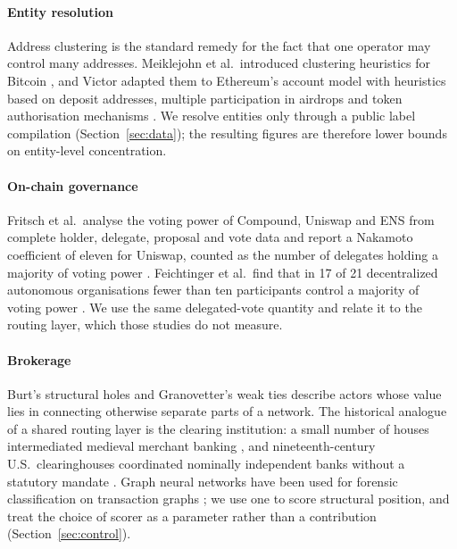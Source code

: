 \paragraph{Entity resolution}
Address clustering is the standard remedy for the fact that one operator
may control many addresses. Meiklejohn et al.\ introduced clustering
heuristics for Bitcoin \cite{meiklejohn2013fistful}, and Victor adapted
them to Ethereum's account model with heuristics based on deposit
addresses, multiple participation in airdrops and token authorisation
mechanisms \cite{victor2020clustering}. We resolve entities only through a public label
compilation (Section~\ref{sec:data}); the resulting figures are therefore
lower bounds on entity-level concentration.

\paragraph{On-chain governance}
Fritsch et al.\ analyse the voting power of Compound, Uniswap and ENS from
complete holder, delegate, proposal and vote data and report a Nakamoto
coefficient of eleven for Uniswap, counted as the number of delegates
holding a majority of voting power \cite{fritsch2024voting}. Feichtinger et
al.\ find that in 17 of 21 decentralized autonomous organisations fewer than
ten participants control a majority of voting power
\cite{feichtinger2023hidden}. We use the same delegated-vote quantity and
relate it to the routing layer, which those studies do not measure.

\paragraph{Brokerage}
Burt's structural holes \cite{burt1992structural, burt2004structural} and
Granovetter's weak ties \cite{granovetter1973strength} describe actors whose
value lies in connecting otherwise separate parts of a network. The
historical analogue of a shared routing layer is the clearing institution:
a small number of houses intermediated medieval merchant banking
\cite{deroover1948medici}, and nineteenth-century U.S.\ clearinghouses
coordinated nominally independent banks without a statutory mandate
\cite{gorton1987joint}. Graph neural networks
\cite{kipf2017semi, velickovic2018graph, hamilton2017inductive} have been
used for forensic classification on transaction graphs
\cite{weber2019anti}; we use one to score structural position, and treat
the choice of scorer as a parameter rather than a contribution
(Section~\ref{sec:control}).
